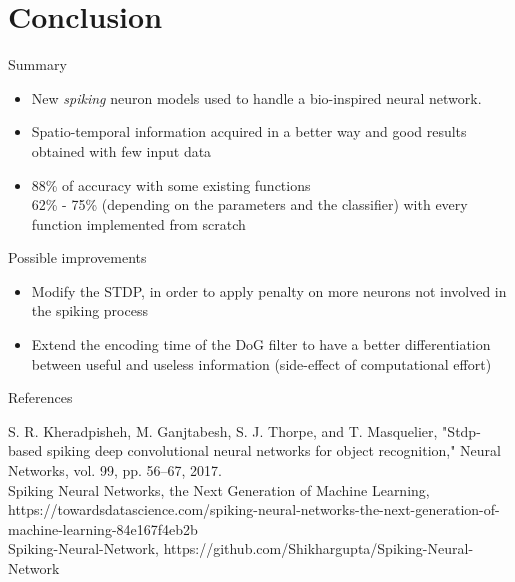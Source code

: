 \documentclass[10pt]{beamer}
\begin{document}
\section{Conclusion}

\begin{frame}{Summary}

\begin{itemize}
	\item New \textit{spiking} neuron models used to handle a bio-inspired neural network.\\
	\bigskip
	\item Spatio-temporal information acquired in a better way and good results obtained with few input data\\
	\bigskip
	\item 88\% of accuracy with some existing functions\\
	62\% - 75\% (depending on the parameters and the classifier) with every function implemented from scratch
\end{itemize}

\end{frame}

\begin{frame}{Possible improvements}

\begin{itemize}
	\item Modify the STDP, in order to apply penalty on more neurons not involved in the spiking process\\
	\bigskip
	\item Extend the encoding time of the DoG filter to have a better differentiation between useful and useless information  (side-effect of computational effort)

\end{itemize}

\end{frame}

\begin{frame}{References}

\begin{thebibliography}{3}	
     S. R. Kheradpisheh, M. Ganjtabesh, S. J. Thorpe, and
  T. Masquelier, "Stdp-based spiking deep convolutional neural
  networks for object recognition," Neural Networks, vol. 99,
  pp. 56–67, 2017.
  \\[1.2em]
  Spiking Neural Networks, the Next Generation of Machine Learning, https://towardsdatascience.com/spiking-neural-networks-the-next-generation-of-machine-learning-84e167f4eb2b
  \\[1.2em]
  Spiking-Neural-Network, https://github.com/Shikhargupta/Spiking-Neural-Network
\end{thebibliography}

\end{frame}
\end{document}
